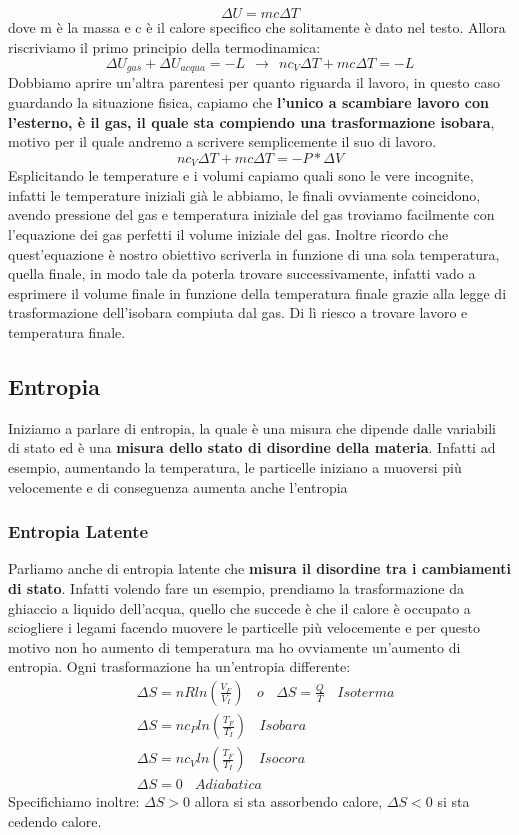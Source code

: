 \documentclass{article}
\numberwithin{equation}{subsection}
\begin{document}
\begin{equation}
    \Delta U = mc\Delta T
\end{equation}
dove m è la massa e c è il calore specifico che solitamente è dato nel testo. Allora riscriviamo il primo principio della termodinamica:
\begin{equation}
    \Delta U_{gas} + \Delta U_{acqua} = -L \ \  \xrightarrow{} \ \ nc_V\Delta T + mc\Delta T=-L
\end{equation}
Dobbiamo aprire un'altra parentesi per quanto riguarda il lavoro, in questo caso guardando la situazione fisica, capiamo che \textbf{l'unico a scambiare lavoro con l'esterno, è il gas, il quale sta compiendo una trasformazione isobara}, motivo per il quale andremo a scrivere semplicemente il suo di lavoro.
\begin{equation}
    nc_V\Delta T + mc\Delta T=-P* \Delta V
\end{equation}
Esplicitando le temperature e i volumi capiamo quali sono le vere incognite, infatti le temperature iniziali già le abbiamo, le finali ovviamente coincidono, avendo pressione del gas e temperatura iniziale del gas troviamo facilmente con l'equazione dei gas perfetti il volume iniziale del gas. Inoltre ricordo che quest'equazione è nostro obiettivo scriverla in funzione di una sola temperatura, quella finale, in modo tale da poterla trovare successivamente, infatti vado a esprimere il volume finale in funzione della temperatura finale grazie alla legge di trasformazione dell'isobara compiuta dal gas. Di lì riesco a trovare lavoro e temperatura finale.
\subsection{Entropia}
Iniziamo a parlare di entropia, la quale è una misura che dipende dalle variabili di stato ed è una \textbf{misura dello stato di disordine della materia}. Infatti ad esempio, aumentando la temperatura, le particelle iniziano a muoversi più velocemente e di conseguenza aumenta anche l'entropia
\subsubsection{Entropia Latente}
Parliamo anche di entropia latente che \textbf{misura il disordine tra i cambiamenti di stato}. Infatti volendo fare un esempio, prendiamo la trasformazione da ghiaccio a liquido dell'acqua, quello che succede è che il calore è occupato a sciogliere i legami facendo muovere le particelle più velocemente e per questo motivo non ho aumento di temperatura ma ho ovviamente un'aumento di entropia. Ogni trasformazione ha un'entropia differente:
\begin{align}
    & \Delta S = nRln(\frac{V_F}{V_I}) \ \ \ \ o \ \ \ \ \Delta S=\frac{Q}{T} \ \ \ \ Isoterma \\
    & \Delta S = nc_Pln(\frac{T_F}{T_I}) \ \ \ \ Isobara \\
    & \Delta S = nc_Vln(\frac{T_F}{T_I}) \ \ \ \ Isocora \\
    & \Delta S = 0 \ \ \ \ Adiabatica 
\end{align}
Specifichiamo inoltre: $\Delta S>0$ allora si sta assorbendo calore, $\Delta S <0$ si sta cedendo calore.
\end{document}
